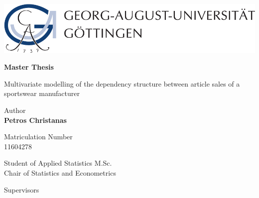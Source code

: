 
\thispagestyle{empty}
\begin{center}


\begin{minipage}{0.75\linewidth}
    \centering
    \includegraphics[scale = 0.7]{figures/uni_goettingen_logo.pdf}\\
    
    \vspace{1cm}
    
{{\Huge \textbf{Master Thesis} \par}}
    
\vspace{0.5cm}
    
    {{\LARGE Multivariate modelling of the dependency structure between article sales of a sportswear manufacturer\par}}
    \vspace{1cm}
    
    
\begin{center}
Author\\
{\LARGE \textbf{Petros Christanas}} \\


\vspace{0.5cm}

Matriculation Number \\
{\large 11604278}

\vspace{1cm}

{\Large Student of Applied Statistics M.Sc.}\\
{\large Chair of Statistics and Econometrics}

\end{center}
    
    \end{minipage}
\end{center}


\vspace{2cm}

\noindent Supervisors\\
 \\
 \\

\vspace{1cm}
    
\begin{flushleft}
\noindent {\Large \today}
\end{flushleft}

    
    

\clearpage